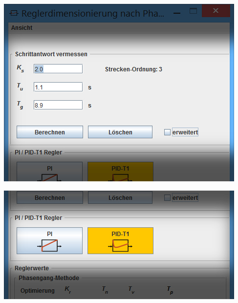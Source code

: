 \begin{minipage}[t][][b]{0.45\textwidth}
    \centering
    \begin{minipage}[c][][b]{\textwidth}
        \centering
        \includegraphics[width=\textwidth]{images/toolStartPIDSmallSchrittantwort.jpg}
        \label{fig:toolStartPIDSmallSchrittantwort}
    \end{minipage}

    \begin{minipage}[c][][b]{\textwidth}
        \centering
        \includegraphics[width=\textwidth]{images/toolStartPIDSmallButtons.jpg}
        \label{fig:toolStartPIDSmallButtons}
    \end{minipage}


\end{minipage}
